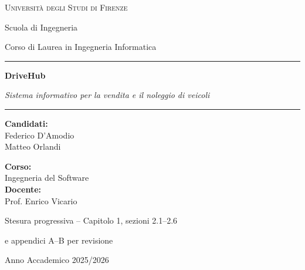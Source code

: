 \documentclass[12pt,a4paper]{report}
\begin{document}
\hypersetup{pageanchor=false}
\begin{titlepage}
  \centering
  {\Large\textsc{Università degli Studi di Firenze}\par}
  {\large Scuola di Ingegneria\par}
  {\large Corso di Laurea in Ingegneria Informatica\par}
  \vspace{2cm}
  \rule{\linewidth}{.5pt}\par\vspace{.8cm}
  {\Huge\bfseries\color{blue!55!black} DriveHub\par}\vspace{.35cm}
  {\Large\itshape Sistema informativo per la vendita e il noleggio di veicoli\par}
  \vspace{.8cm}\rule{\linewidth}{.5pt}\par
  \vspace{1.7cm}
  \begin{minipage}[t]{.48\linewidth}\raggedright
    \textbf{Candidati:}\\[.3cm]
    Federico D'Amodio\\
    Matteo Orlandi
  \end{minipage}\hfill
  \begin{minipage}[t]{.48\linewidth}\raggedleft
    \textbf{Corso:}\\
    Ingegneria del Software\\[.35cm]
    \textbf{Docente:}\\
    Prof. Enrico Vicario
  \end{minipage}
  \vfill
  {\small Stesura progressiva -- Capitolo 1, sezioni 2.1--2.6\par
  e appendici A--B per revisione\par}
  \vspace{.4cm}
  {\large Anno Accademico 2025/2026\par}
\end{titlepage}
\hypersetup{pageanchor=true}
\tableofcontents
\clearpage
{}





\appendix

\end{document}
